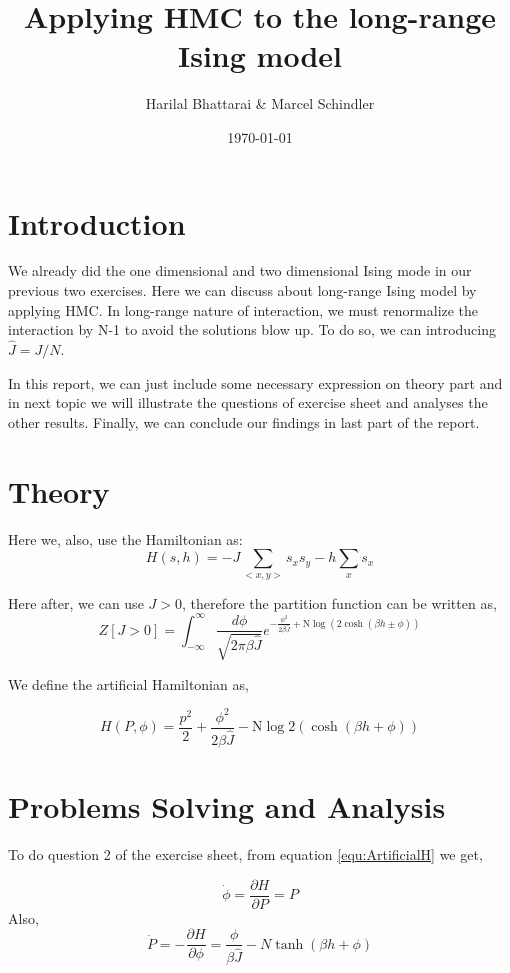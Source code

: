 \documentclass[11pt, a4paper, DIV=12]{scrartcl}
\title{Applying HMC to the long-range Ising model}
\date{\today}
\author{Harilal Bhattarai \& Marcel Schindler}
\begin{document}
	\maketitle
\section{Introduction}

We already did the one dimensional and two dimensional Ising mode in our previous two exercises. Here we can discuss about long-range Ising model by applying HMC. In long-range nature of interaction, we must renormalize the interaction by N-1 to avoid the solutions blow up. To do so, we can introducing  $ \hat{J}=J/N $.

In this report, we can just include some necessary expression on theory part and in next topic we will illustrate the questions of exercise sheet and analyses the other results. Finally, we can conclude our findings in last part of the report.
\section{Theory}
Here we, also, use the Hamiltonian as:
\begin{equation}
H(s, h)= -J \sum_{<x,y>}s_{x}s_{y} - h \sum_{x}s_{x}
\end{equation}

Here after, we can use $ J > 0 $, therefore the partition function can be written as,
\begin{equation}
Z[J>0]=\int_{-\infty}^{\infty}\frac{d\phi}{\sqrt{2\pi \beta \hat{J}}} e^{-\frac{\phi^2}{2\beta \hat{J}} + \text{N}\log(2\cosh(\beta h \pm \phi))}
\end{equation}

We define the artificial Hamiltonian as,

\begin{equation}
{H(P, \phi)}= \frac{p^2}{2} + \frac{\phi^2}{2\beta \hat{J}} - \text{N}\log 2(\cosh(\beta h + \phi))
\label{equ:ArtificialH}
\end{equation}

\section{Problems Solving and Analysis}

To do question 2 of the exercise sheet, from equation \ref{equ:ArtificialH} we get,

\begin{equation}
\dot{\phi}=\frac{\partial H}{\partial P}= P
\end{equation}
Also,
\begin{equation}
\dot{P}=-\frac{\partial H}{\partial \phi}= \frac{\phi}{\beta \hat{J}} - N \tanh(\beta h+ \phi)
\end{equation}
\end{document}
